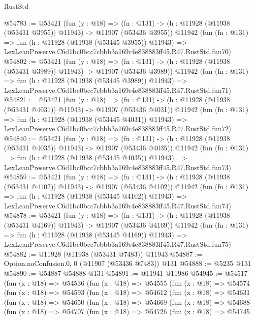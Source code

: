 \begin{lexlean}{RustStd}
\begin{coremodule}
@54783 := @53421
    (fun (y : @18) =>
    (fn : @131) -> (h : @11928 (@11938 (@53431 @3955)) @11943) -> @11907 (@53436 @3955))
    @11942
    (fun (fn : @131) =>
    fun (h : @11928 (@11938 (@53445 @3955)) @11943) =>
    LexLeanPreserve.C6d1bc0bcc7cbbb3a169c4e838883ff45.R47.RustStd.fun70)
@54802 := @53421
    (fun (y : @18) =>
    (fn : @131) -> (h : @11928 (@11938 (@53431 @3989)) @11943) -> @11907 (@53436 @3989))
    @11942
    (fun (fn : @131) =>
    fun (h : @11928 (@11938 (@53445 @3989)) @11943) =>
    LexLeanPreserve.C6d1bc0bcc7cbbb3a169c4e838883ff45.R47.RustStd.fun71)
@54821 := @53421
    (fun (y : @18) =>
    (fn : @131) -> (h : @11928 (@11938 (@53431 @4031)) @11943) -> @11907 (@53436 @4031))
    @11942
    (fun (fn : @131) =>
    fun (h : @11928 (@11938 (@53445 @4031)) @11943) =>
    LexLeanPreserve.C6d1bc0bcc7cbbb3a169c4e838883ff45.R47.RustStd.fun72)
@54840 := @53421
    (fun (y : @18) =>
    (fn : @131) -> (h : @11928 (@11938 (@53431 @4035)) @11943) -> @11907 (@53436 @4035))
    @11942
    (fun (fn : @131) =>
    fun (h : @11928 (@11938 (@53445 @4035)) @11943) =>
    LexLeanPreserve.C6d1bc0bcc7cbbb3a169c4e838883ff45.R47.RustStd.fun73)
@54859 := @53421
    (fun (y : @18) =>
    (fn : @131) -> (h : @11928 (@11938 (@53431 @4102)) @11943) -> @11907 (@53436 @4102))
    @11942
    (fun (fn : @131) =>
    fun (h : @11928 (@11938 (@53445 @4102)) @11943) =>
    LexLeanPreserve.C6d1bc0bcc7cbbb3a169c4e838883ff45.R47.RustStd.fun74)
@54878 := @53421
    (fun (y : @18) =>
    (fn : @131) -> (h : @11928 (@11938 (@53431 @4169)) @11943) -> @11907 (@53436 @4169))
    @11942
    (fun (fn : @131) =>
    fun (h : @11928 (@11938 (@53445 @4169)) @11943) =>
    LexLeanPreserve.C6d1bc0bcc7cbbb3a169c4e838883ff45.R47.RustStd.fun75)
@54882 := @11928 (@11938 (@53431 @7483)) @11943
@54887 := Option.noConfusion.{0, 0} (@11907 (@53436 @7483)) @131
@54888 := @5235 @131
@54890 := @54887 @54888 @131
@54891 := @11941 @11986
@54945 := @54517
    (fun (x : @18) =>
    @54536
      (fun (x : @18) =>
      @54555
        (fun (x : @18) =>
        @54574
          (fun (x : @18) =>
          @54593
            (fun (x : @18) =>
            @54612
              (fun (x : @18) =>
              @54631
                (fun (x : @18) =>
                @54650
                  (fun (x : @18) =>
                  @54669
                    (fun (x : @18) =>
                    @54688
                      (fun (x : @18) =>
                      @54707
                        (fun (x : @18) =>
                        @54726
                          (fun (x : @18) =>
                          @54745

\end{coremodule}
\end{lexlean}
